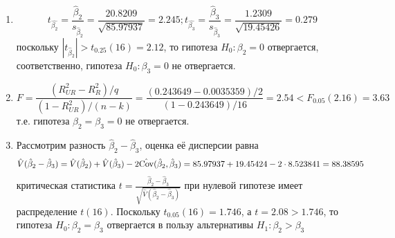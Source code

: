 \documentclass[pdftex,12pt,a4paper]{article}
\begin{document}
\begin{enumerate}
\begin{enumerate}
\item 
\begin{equation}
t_{\hat{\beta_2}}=\frac{\hat{\beta}_2}{s_{\hat{\beta}_2}}=\frac{20.8209}{\sqrt{85.97937}}=2.245; t_{\hat{\beta_3}}=\frac{\hat{\beta}_3}{s_{\hat{\beta}_3}}=\frac{1.2309}{\sqrt{19.45426}}=0.279
\end{equation}
поскольку $|t_{\hat{\beta}_2}|>t_{0.25}(16)=2.12$, то гипотеза $H_0: \beta_2=0$ отвергается, соответственно, гипотеза $H_0:\beta_3=0$ не отвергается.
\item 
\begin{equation}
F=\frac{(R_{UR}^2-R_R^2)/q}{(1-R_{UR}^2)/(n-k)}=\frac{(0.243649-0.0035359)/2}{(1-0.243649)/16}=2.54<F_{0.05}(2.16)=3.63
\end{equation}
т.е. гипотеза $\beta_2=\beta_3=0$ не отвергается.
\item Рассмотрим разность $\hat{\beta}_2-\hat{\beta}_3$, оценка её дисперсии равна 
\begin{equation}
\hat{V}(\hat{\beta}_2-\hat{\beta}_3)=\hat{V}(\hat{\beta}_2)+\hat{V}(\hat{\beta}_3)-2\hat{\operatorname{Cov}}(\hat{\beta}_2,\hat{\beta}_3)=85.97937+19.45424-2\cdot8.523841=88.38595
\end{equation}
критическая статистика $t=\frac{\hat{\beta}_2-\hat{\beta}_3}{\sqrt{\hat{V}(\hat{\beta}_2-\hat{\beta}_3)}}$ при нулевой гипотезе имеет распределение $t(16)$. Поскольку $t_{0.05}(16)=1.746$, а $t=2.08>1.746$, то гипотеза $H_0: \beta_2=\beta_3$ отвергается в пользу альтернативы $H_1:\beta_2>\beta_3$
\end{enumerate}
\end{enumerate}
\end{document}
